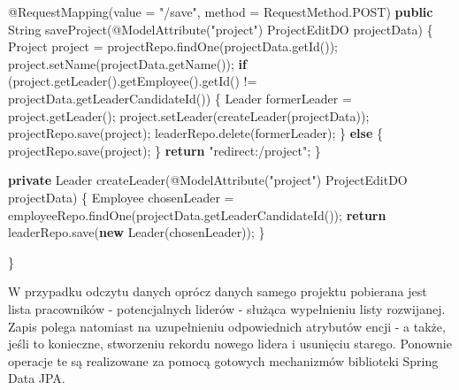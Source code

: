 \documentclass[]{article}
\newenvironment{Shaded}{}{}
\newcommand{\AttributeTok}[1]{\textcolor[rgb]{0.49,0.56,0.16}{#1}}
\newcommand{\BuiltInTok}[1]{#1}
\newcommand{\FunctionTok}[1]{\textcolor[rgb]{0.02,0.16,0.49}{#1}}
\newcommand{\KeywordTok}[1]{\textcolor[rgb]{0.00,0.44,0.13}{\textbf{#1}}}
\newcommand{\NormalTok}[1]{#1}
\newcommand{\StringTok}[1]{\textcolor[rgb]{0.25,0.44,0.63}{#1}}
\begin{document}
\begin{Shaded}
\begin{Highlighting}[]
    \AttributeTok{@RequestMapping}\NormalTok{(value = }\StringTok{"/save"}\NormalTok{, method = RequestMethod.}\FunctionTok{POST}\NormalTok{)}
    \KeywordTok{public} \BuiltInTok{String} \FunctionTok{saveProject}\NormalTok{(}\AttributeTok{@ModelAttribute}\NormalTok{(}\StringTok{"project"}\NormalTok{) ProjectEditDO projectData) \{}
\NormalTok{        Project project = projectRepo.}\FunctionTok{findOne}\NormalTok{(projectData.}\FunctionTok{getId}\NormalTok{());}
\NormalTok{        project.}\FunctionTok{setName}\NormalTok{(projectData.}\FunctionTok{getName}\NormalTok{());}
        \KeywordTok{if}\NormalTok{ (project.}\FunctionTok{getLeader}\NormalTok{().}\FunctionTok{getEmployee}\NormalTok{().}\FunctionTok{getId}\NormalTok{() != projectData.}\FunctionTok{getLeaderCandidateId}\NormalTok{()) \{}
\NormalTok{            Leader formerLeader = project.}\FunctionTok{getLeader}\NormalTok{();}
\NormalTok{            project.}\FunctionTok{setLeader}\NormalTok{(}\FunctionTok{createLeader}\NormalTok{(projectData));}
\NormalTok{            projectRepo.}\FunctionTok{save}\NormalTok{(project);}
\NormalTok{            leaderRepo.}\FunctionTok{delete}\NormalTok{(formerLeader);}
\NormalTok{        \} }\KeywordTok{else}\NormalTok{ \{}
\NormalTok{            projectRepo.}\FunctionTok{save}\NormalTok{(project);}
\NormalTok{        \}}
        \KeywordTok{return} \StringTok{"redirect:/project"}\NormalTok{;}
\NormalTok{    \}}

    \KeywordTok{private}\NormalTok{ Leader }\FunctionTok{createLeader}\NormalTok{(}\AttributeTok{@ModelAttribute}\NormalTok{(}\StringTok{"project"}\NormalTok{) ProjectEditDO projectData) \{}
\NormalTok{        Employee chosenLeader = employeeRepo.}\FunctionTok{findOne}\NormalTok{(projectData.}\FunctionTok{getLeaderCandidateId}\NormalTok{());}
        \KeywordTok{return}\NormalTok{ leaderRepo.}\FunctionTok{save}\NormalTok{(}\KeywordTok{new} \FunctionTok{Leader}\NormalTok{(chosenLeader));}
\NormalTok{    \}}

\NormalTok{\}}
\end{Highlighting}
\end{Shaded}

W przypadku odczytu danych oprócz danych samego projektu pobierana jest
lista pracowników - potencjalnych liderów - służąca wypełnieniu listy
rozwijanej. Zapis polega natomiast na uzupełnieniu odpowiednich
atrybutów encji - a także, jeśli to konieczne, stworzeniu rekordu nowego
lidera i usunięciu starego. Ponownie operacje te są realizowane za
pomocą gotowych mechanizmów biblioteki Spring Data JPA.
\end{document}
